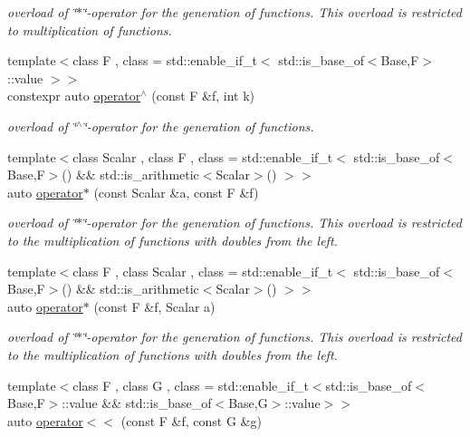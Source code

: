 \begin{DoxyCompactItemize}
\begin{DoxyCompactList}\small\item\em overload of \char`\"{}$\ast$\char`\"{}-\/operator for the generation of functions. This overload is restricted to multiplication of functions. \end{DoxyCompactList}\item 
{\footnotesize template$<$class F , class  = std\-::enable\-\_\-if\-\_\-t$<$ std\-::is\-\_\-base\-\_\-of$<$\-Base,\-F$>$\-::value $>$$>$ }\\constexpr auto \hyperlink{namespaceRFFGen_ab2e1b87874474c32b20338fc3c60be5a}{operator$^\wedge$} (const F \&f, int k)
\begin{DoxyCompactList}\small\item\em overload of \char`\"{}$^\wedge$\char`\"{}-\/operator for the generation of functions. \end{DoxyCompactList}\item 
{\footnotesize template$<$class Scalar , class F , class  = std\-::enable\-\_\-if\-\_\-t$<$ std\-::is\-\_\-base\-\_\-of$<$\-Base,\-F$>$() \&\& std\-::is\-\_\-arithmetic$<$\-Scalar$>$() $>$$>$ }\\auto \hyperlink{namespaceRFFGen_a7be854ac2257ddf852ddb3ac6cfc413d}{operator$\ast$} (const Scalar \&a, const F \&f)
\begin{DoxyCompactList}\small\item\em overload of \char`\"{}$\ast$\char`\"{}-\/operator for the generation of functions. This overload is restricted to the multiplication of functions with doubles from the left. \end{DoxyCompactList}\item 
{\footnotesize template$<$class F , class Scalar , class  = std\-::enable\-\_\-if\-\_\-t$<$ std\-::is\-\_\-base\-\_\-of$<$\-Base,\-F$>$() \&\& std\-::is\-\_\-arithmetic$<$\-Scalar$>$() $>$$>$ }\\auto \hyperlink{namespaceRFFGen_a6e94e177aaa2786b8d504273a402b41e}{operator$\ast$} (const F \&f, Scalar a)
\begin{DoxyCompactList}\small\item\em overload of \char`\"{}$\ast$\char`\"{}-\/operator for the generation of functions. This overload is restricted to the multiplication of functions with doubles from the left. \end{DoxyCompactList}\item 
{\footnotesize template$<$class F , class G , class  = std\-::enable\-\_\-if\-\_\-t$<$std\-::is\-\_\-base\-\_\-of$<$\-Base,\-F$>$\-::value \&\&                                     std\-::is\-\_\-base\-\_\-of$<$\-Base,\-G$>$\-::value$>$$>$ }\\auto \hyperlink{namespaceRFFGen_a2c40e5d41ad211f6d861f2862a02e670}{operator$<$$<$} (const F \&f, const G \&g)

\end{DoxyCompactItemize}
